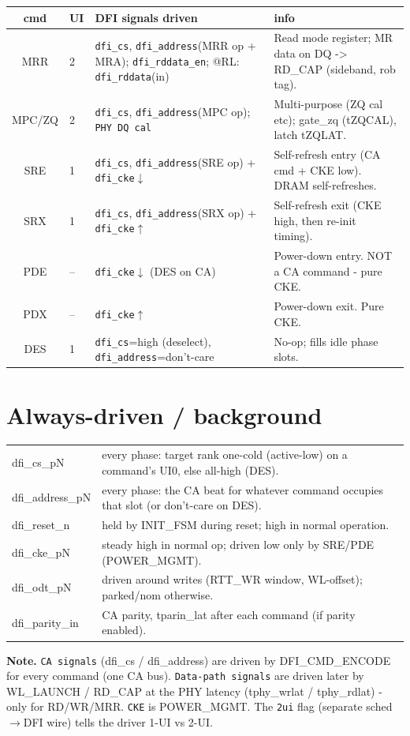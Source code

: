\documentclass[9pt]{extarticle}
\newcommand{\ca}[1]{\textcolor{ccol}{\texttt{#1}}}
\newcommand{\dq}[1]{\textcolor{dcol}{\texttt{#1}}}
\newcommand{\pw}[1]{\textcolor{pcol}{\texttt{#1}}}
\newenvironment{drive}{%
  \footnotesize\begin{longtable}{C U G X}\toprule
  \textbf{cmd} & \textbf{UI} & \textbf{DFI signals driven} & \textbf{info}\\ \midrule\endhead}
  {\bottomrule\end{longtable}}
\begin{document}
\begin{drive}
MRR & 2 & \ca{dfi\_cs}, \ca{dfi\_address}(MRR op + MRA); \dq{dfi\_rddata\_en}; @RL: \dq{dfi\_rddata}(in)
   & Read mode register; MR data on DQ -> RD\_CAP (sideband, rob tag).\\
MPC/ZQ & 2 & \ca{dfi\_cs}, \ca{dfi\_address}(MPC op); \dq{PHY DQ cal}
   & Multi-purpose (ZQ cal etc); gate\_zq (tZQCAL), latch tZQLAT.\\
SRE & 1 & \ca{dfi\_cs}, \ca{dfi\_address}(SRE op) + \pw{dfi\_cke}$\downarrow$
   & Self-refresh entry (CA cmd + CKE low). DRAM self-refreshes.\\
SRX & 1 & \ca{dfi\_cs}, \ca{dfi\_address}(SRX op) + \pw{dfi\_cke}$\uparrow$
   & Self-refresh exit (CKE high, then re-init timing).\\
PDE & -- & \pw{dfi\_cke}$\downarrow$ (DES on CA)
   & Power-down entry. NOT a CA command - pure CKE.\\
PDX & -- & \pw{dfi\_cke}$\uparrow$
   & Power-down exit. Pure CKE.\\
DES & 1 & \ca{dfi\_cs}=high (deselect), \ca{dfi\_address}=don't-care
   & No-op; fills idle phase slots.\\
\end{drive}

\section*{Always-driven / background}
\begin{tabular}{>{\ttfamily\footnotesize}l >{\footnotesize\raggedright\arraybackslash}p{13cm}}
\toprule
dfi\_cs\_pN & every phase: target rank one-cold (active-low) on a command's UI0, else all-high (DES).\\
dfi\_address\_pN & every phase: the CA beat for whatever command occupies that slot (or don't-care on DES).\\
dfi\_reset\_n & held by INIT\_FSM during reset; high in normal operation.\\
dfi\_cke\_pN & steady high in normal op; driven low only by SRE/PDE (POWER\_MGMT).\\
dfi\_odt\_pN & driven around writes (RTT\_WR window, WL-offset); parked/nom otherwise.\\
dfi\_parity\_in & CA parity, tparin\_lat after each command (if parity enabled).\\
\bottomrule
\end{tabular}

\vspace{5pt}
{\footnotesize \textbf{Note.} \ca{CA signals} (dfi\_cs / dfi\_address) are driven by DFI\_CMD\_ENCODE
for every command (one CA bus). \dq{Data-path signals} are driven later by WL\_LAUNCH / RD\_CAP at
the PHY latency (tphy\_wrlat / tphy\_rdlat) - only for RD/WR/MRR. \pw{CKE} is POWER\_MGMT.
The \texttt{2ui} flag (separate sched$\rightarrow$DFI wire) tells the driver 1-UI vs 2-UI.}
\end{document}
